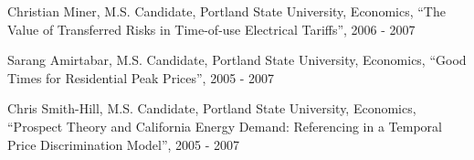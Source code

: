 \documentclass[Computer Science]{vita}
\begin{document}
\begin{vita}
  \begin{Instructional Activities}






    \begin{M.S. Project Adviser}

    \item Christian Miner, M.S. Candidate, Portland State University,
      Economics, ``The Value of Transferred Risks in Time-of-use
      Electrical Tariffs'', 2006 - 2007

    \item Sarang Amirtabar, M.S. Candidate, Portland State University,
      Economics, ``Good Times for Residential Peak Prices'', 2005 -
      2007

    \item Chris Smith-Hill, M.S. Candidate, Portland State University,
      Economics, ``Prospect Theory and California Energy Demand:
      Referencing in a Temporal Price Discrimination Model'', 2005 -
      2007
    \end{M.S. Project Adviser}

  \end{Instructional Activities}






\end{vita}
\end{document}
